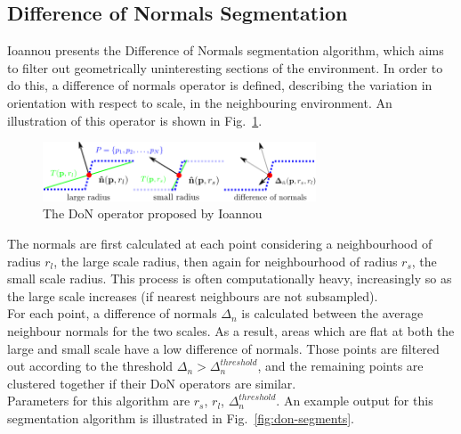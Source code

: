 \subsection{Difference of Normals Segmentation}
\label{subsec:DoN}

Ioannou \cite{ioannou2012difference} presents the Difference of Normals segmentation algorithm, which aims to filter out geometrically uninteresting sections of the environment.  
In order to do this, a difference of normals operator is defined, describing the variation in orientation with respect to scale, in the neighbouring environment. An illustration of this operator is shown in Fig.~\ref{fig:DoN}.\\

\begin{figure}
  \centering
  \includegraphics[width=3.2in]{images/DoN.png}
  \caption{The DoN operator proposed by Ioannou \cite{ioannou2012difference}}
  \label{fig:DoN}
\end{figure}

The normals are first calculated at each point considering a neighbourhood of radius $r_l$, the large scale radius, then again for neighbourhood of radius $r_s$, the small scale radius. This process is often computationally heavy, increasingly so as the large scale increases (if nearest neighbours are not subsampled).\\

For each point, a difference of normals $\Delta_n$ is calculated between the average neighbour normals for the two scales. As a result, areas which are flat at both the large and small scale have a low difference of normals. Those points are filtered out according to the threshold $\Delta_n > \Delta_n^{threshold}$, and the remaining points are clustered together if their DoN operators are similar.\\

Parameters for this algorithm are $r_s$, $r_l$, $\Delta_n^{threshold}$. An example output for this segmentation algorithm is illustrated in Fig.~\ref{fig:don-segments}.\\

